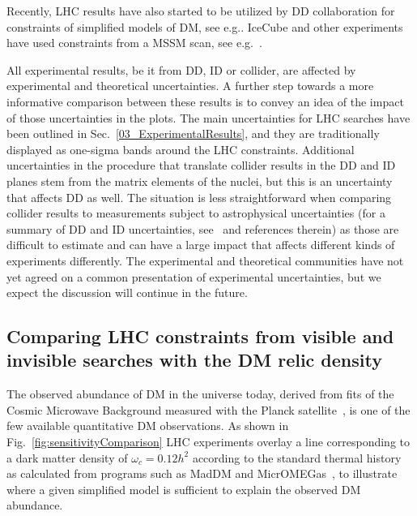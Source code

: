 Recently, LHC results have also started to be utilized by DD collaboration for constraints of simplified models of DM, see e.g.\cite{PhysRevLett.118.251301,Balazs:2017hxh}. IceCube and other experiments have used constraints from a MSSM scan, see e.g.~\cite{Aartsen:2016zhm}. 




All experimental results, be it from DD, ID or collider, are affected by experimental and theoretical uncertainties.
A further step towards a more informative comparison between these results is to convey 
an idea of the impact of those uncertainties in the plots. 
The main uncertainties for LHC searches have been outlined in Sec.~\ref{03_ExperimentalResults},
and they are traditionally displayed as one-sigma bands around the LHC constraints. 
Additional uncertainties in the procedure that translate collider results in the DD and ID planes
stem from the matrix elements of the nuclei, but this is an uncertainty that
affects DD as well. %
The situation is less straightforward when comparing collider results to measurements subject to astrophysical
uncertainties (for a summary of DD and ID uncertainties, see~\cite{Feldstein:2014ufa,d300ef23986a49099715e661295a4d72}
and references therein) as those are difficult to estimate and can have a large impact that affects 
different kinds of experiments differently. 
The experimental and theoretical communities have not yet agreed on a common presentation of experimental uncertainties, 
but we expect the discussion will continue in the future. 

\subsection{Comparing LHC constraints from visible and invisible searches with the DM relic density}

The observed abundance of DM in the universe today, derived from fits of the Cosmic Microwave Background
measured with the Planck satellite~\cite{Ade:2015xua}, is one
of the few %
available quantitative DM observations. 
As shown in Fig.~\ref{fig:sensitivityComparison} LHC experiments overlay a line corresponding to 
a dark matter density of $\omega_c = 0.12 h^2$ according to the standard thermal history as calculated
from programs such as MadDM and MicrOMEGas~\cite{Backovic:2015cra,Barducci:2016pcb}, to 
illustrate where a given simplified model is sufficient to explain the observed DM abundance. 

